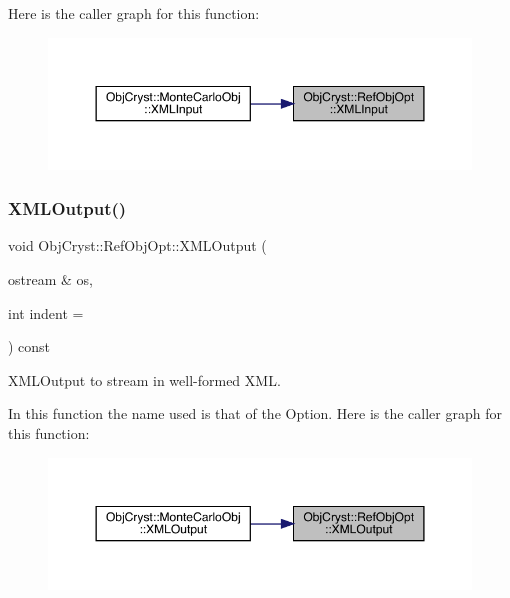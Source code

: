 Here is the caller graph for this function\+:
\nopagebreak
\begin{figure}[H]
\begin{center}
\leavevmode
\includegraphics[width=350pt]{class_obj_cryst_1_1_ref_obj_opt_a9562e469ee61a710e535594fe58f0744_icgraph}
\end{center}
\end{figure}
\mbox{\label{class_obj_cryst_1_1_ref_obj_opt_aebeb771ffe0744aac86352f38ea67f42}} 
\subsubsection{\texorpdfstring{XMLOutput()}{XMLOutput()}}
{\footnotesize\ttfamily void Obj\+Cryst\+::\+Ref\+Obj\+Opt\+::\+X\+M\+L\+Output (\begin{DoxyParamCaption}\item[{ostream \&}]{os,  }\item[{int}]{indent = {} }\end{DoxyParamCaption}) const}



X\+M\+L\+Output to stream in well-\/formed X\+ML. 

In this function the name used is that of the Option. Here is the caller graph for this function\+:
\nopagebreak
\begin{figure}[H]
\begin{center}
\leavevmode
\includegraphics[width=350pt]{class_obj_cryst_1_1_ref_obj_opt_aebeb771ffe0744aac86352f38ea67f42_icgraph}
\end{center}
\end{figure}



